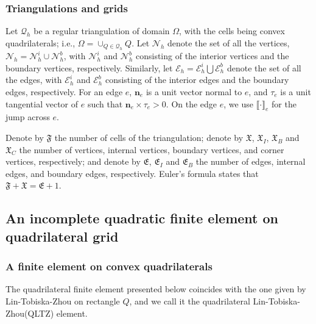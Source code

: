 \documentclass[12pt,showkeys]{amsart}
\begin{document}
\subsubsection{Triangulations and grids}
Let $\mathcal{Q}_h$ be a regular triangulation of domain $\Omega$, with the cells being convex quadrilaterals; i.e., $\displaystyle\Omega=\cup_{Q\in\mathcal{Q}_h}Q$. Let $\mathcal{N}_h$ denote the set of all the vertices, $\mathcal{N}_h=\mathcal{N}_h^i\cup\mathcal{N}_h^b$, with $\mathcal{N}_h^i$ and $\mathcal{N}_h^b$ consisting of the interior vertices and the boundary vertices, respectively. Similarly, let $\mathcal{E}_h=\mathcal{E}_h^i\bigcup\mathcal{E}_h^b$ denote the set of all the edges, with $\mathcal{E}_h^i$ and $\mathcal{E}_h^b$ consisting of the interior edges and the boundary edges, respectively. For an edge $e$, $\mathbf{n}_e$ is a unit vector normal to $e$, and $\tau_e$ is a unit tangential vector of $e$ such that $\mathbf{n}_e\times\tau_e>0$. On the edge $e$, we use $\llbracket\cdot\rrbracket_e$ for the jump across $e$. 

Denote by $\mathfrak{F}$ the number of cells of the triangulation; denote by $\mathfrak{X}$, $\mathfrak{X}_I$, $\mathfrak{X}_B$ and $\mathfrak{X}_C$ the number of vertices, internal vertices, boundary vertices, and corner vertices, respectively; and denote by $\mathfrak{E}$, $\mathfrak{E}_I$ and $\mathfrak{E}_B$ the number of edges, internal edges, and boundary edges, respectively. Euler's formula states that $\mathfrak{F}+\mathfrak{X}=\mathfrak{E}+1$.

\subsection{An incomplete quadratic finite element on quadrilateral grid}
\label{sec:femecr}

\subsubsection{A finite element on convex quadrilaterals}
The quadrilateral finite element presented below coincides with the one given by Lin-Tobiska-Zhou\cite{Lin.Q;Tobiska.L;Zhou.A2005} on rectangle $Q$, and we call it the quadrilateral Lin-Tobiska-Zhou(QLTZ) element.
\\
{\centering
{}}
\end{document}
